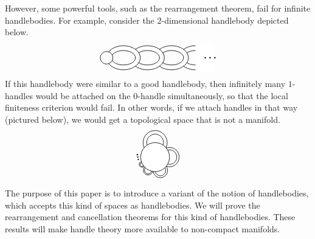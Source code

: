 However, some powerful tools, such as the rearrangement theorem,
fail for infinite handlebodies.
For example, consider the $2$-dimensional handlebody depicted below.
\[ \begin{tikzpicture}[line width=.6]
    \draw (0,0) circle (.26);
    \draw (1.4,0) arc (0 : 151 : .7 and .5);
    \draw (1.4,0) arc (0 : -151 : .7 and .5);
    \draw (1.2,0) arc (0 : 159 : .5 and .3);
    \draw (1.2,0) arc (0 : -159 : .5 and .3);
    \draw (2.4,0) arc (0 : 136 : .7 and .5);
    \draw (2.4,0) arc (0 : -136 : .7 and .5);
    \draw (2.2,0) arc (0 : 138 : .5 and .3);
    \draw (2.2,0) arc (0 : -138 : .5 and .3);
    \draw (3.4,0) arc (0 : 136 : .7 and .5);
    \draw (3.4,0) arc (0 : -136 : .7 and .5);
    \draw (3.2,0) arc (0 : 138 : .5 and .3);
    \draw (3.2,0) arc (0 : -138 : .5 and .3);
    \draw (4.4,0) arc (0 : 136 : .7 and .5);
    \draw (4.4,0) arc (0 : -136 : .7 and .5);
    \draw (4.2,0) arc (0 : 138 : .5 and .3);
    \draw (4.2,0) arc (0 : -138 : .5 and .3);
    \fill[white] (3.7,.6) rectangle (4.5,-.6);
    \fill (4.1,0) circle (.03);
    \fill (4.3,0) circle (.03);
    \fill (4.5,0) circle (.03);
\end{tikzpicture} \]
If this handlebody were similar to a good handlebody,
then infinitely many $1$-handles would be attached
on the $0$-handle simultaneously,
so that the local finiteness criterion would fail.
In other words, if we attach handles in that way (pictured below),
we would get a topological space that is not a manifold.
\[ \begin{tikzpicture}[line width=.6]
    \draw[fill=white] (0,.6) circle (.5);
    \draw[fill=white] (0,.6) circle (.35);
    \draw[fill=white] (.6,0) circle (.4);
    \draw[fill=white] (.6,0) circle (.3);
    \draw[fill=white] (.22,-.55) circle (.3);
    \draw[fill=white] (.22,-.55) circle (.22);
    \draw[fill=white] (-.29,-.54) circle (.2);
    \draw[fill=white] (-.29,-.54) circle (.15);
    \draw[fill=white] (-.54,-.3) circle (.12);
    \draw[fill=white] (-.54,-.3) circle (.08);
    \draw[fill=white] (0,0) circle (.6);
    \fill (-.7, -.1) circle (.03);
    \fill (-.72, 0) circle (.03);
    \fill (-.74, .1) circle (.03);
\end{tikzpicture} \]

The purpose of this paper
is to introduce a variant of the notion of handlebodies,
which accepts this kind of spaces as handlebodies.
We will prove the rearrangement and cancellation theorems 
for this kind of handlebodies.
These results will make handle theory 
more available to non-compact manifolds.
